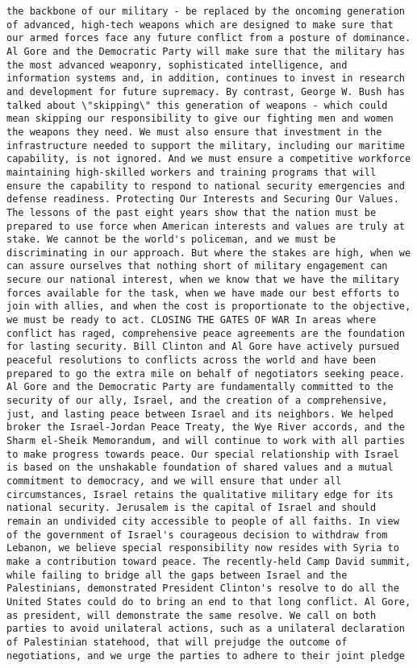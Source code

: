 \documentclass[
]{article}
\begin{document}
\begin{verbatim}
the backbone of our military - be replaced by the oncoming generation of advanced, high-tech weapons which are designed to make sure that our armed forces face any future conflict from a posture of dominance. Al Gore and the Democratic Party will make sure that the military has the most advanced weaponry, sophisticated intelligence, and information systems and, in addition, continues to invest in research and development for future supremacy. By contrast, George W. Bush has talked about \"skipping\" this generation of weapons - which could mean skipping our responsibility to give our fighting men and women the weapons they need. We must also ensure that investment in the infrastructure needed to support the military, including our maritime capability, is not ignored. And we must ensure a competitive workforce maintaining high-skilled workers and training programs that will ensure the capability to respond to national security emergencies and defense readiness. Protecting Our Interests and Securing Our Values. The lessons of the past eight years show that the nation must be prepared to use force when American interests and values are truly at stake. We cannot be the world's policeman, and we must be discriminating in our approach. But where the stakes are high, when we can assure ourselves that nothing short of military engagement can secure our national interest, when we know that we have the military forces available for the task, when we have made our best efforts to join with allies, and when the cost is proportionate to the objective, we must be ready to act. CLOSING THE GATES OF WAR In areas where conflict has raged, comprehensive peace agreements are the foundation for lasting security. Bill Clinton and Al Gore have actively pursued peaceful resolutions to conflicts across the world and have been prepared to go the extra mile on behalf of negotiators seeking peace. Al Gore and the Democratic Party are fundamentally committed to the security of our ally, Israel, and the creation of a comprehensive, just, and lasting peace between Israel and its neighbors. We helped broker the Israel-Jordan Peace Treaty, the Wye River accords, and the Sharm el-Sheik Memorandum, and will continue to work with all parties to make progress towards peace. Our special relationship with Israel is based on the unshakable foundation of shared values and a mutual commitment to democracy, and we will ensure that under all circumstances, Israel retains the qualitative military edge for its national security. Jerusalem is the capital of Israel and should remain an undivided city accessible to people of all faiths. In view of the government of Israel's courageous decision to withdraw from Lebanon, we believe special responsibility now resides with Syria to make a contribution toward peace. The recently-held Camp David summit, while failing to bridge all the gaps between Israel and the Palestinians, demonstrated President Clinton's resolve to do all the United States could do to bring an end to that long conflict. Al Gore, as president, will demonstrate the same resolve. We call on both parties to avoid unilateral actions, such as a unilateral declaration of Palestinian statehood, that will prejudge the outcome of negotiations, and we urge the parties to adhere to their joint pledge 
\end{verbatim}
\end{document}

